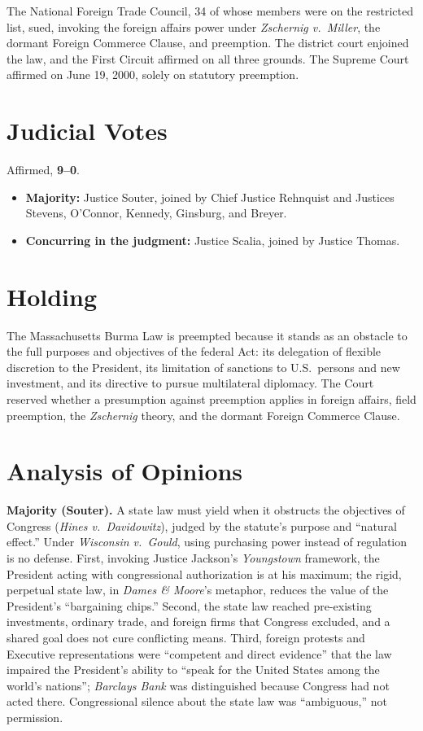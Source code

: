 \documentclass[12pt]{article}
\begin{document}
The National Foreign Trade Council, 34 of whose members were on the restricted list, sued, invoking the foreign affairs power under \textit{Zschernig v.\ Miller}, the dormant Foreign Commerce Clause, and preemption. The district court enjoined the law, and the First Circuit affirmed on all three grounds. The Supreme Court affirmed on June 19, 2000, solely on statutory preemption.

\section{Judicial Votes}

Affirmed, \textbf{9--0}.
\begin{itemize}
\item \textbf{Majority:} Justice Souter, joined by Chief Justice Rehnquist and Justices Stevens, O'Connor, Kennedy, Ginsburg, and Breyer.
\item \textbf{Concurring in the judgment:} Justice Scalia, joined by Justice Thomas.
\end{itemize}

\section{Holding}

The Massachusetts Burma Law is preempted because it stands as an obstacle to the full purposes and objectives of the federal Act: its delegation of flexible discretion to the President, its limitation of sanctions to U.S.\ persons and new investment, and its directive to pursue multilateral diplomacy. The Court reserved whether a presumption against preemption applies in foreign affairs, field preemption, the \textit{Zschernig} theory, and the dormant Foreign Commerce Clause.

\section{Analysis of Opinions}

\textbf{Majority (Souter).} A state law must yield when it obstructs the objectives of Congress (\textit{Hines v.\ Davidowitz}), judged by the statute's purpose and ``natural effect.'' Under \textit{Wisconsin v.\ Gould}, using purchasing power instead of regulation is no defense. First, invoking Justice Jackson's \textit{Youngstown} framework, the President acting with congressional authorization is at his maximum; the rigid, perpetual state law, in \textit{Dames \& Moore}'s metaphor, reduces the value of the President's ``bargaining chips.'' Second, the state law reached pre-existing investments, ordinary trade, and foreign firms that Congress excluded, and a shared goal does not cure conflicting means. Third, foreign protests and Executive representations were ``competent and direct evidence'' that the law impaired the President's ability to ``speak for the United States among the world's nations''; \textit{Barclays Bank} was distinguished because Congress had not acted there. Congressional silence about the state law was ``ambiguous,'' not permission.
\end{document}
